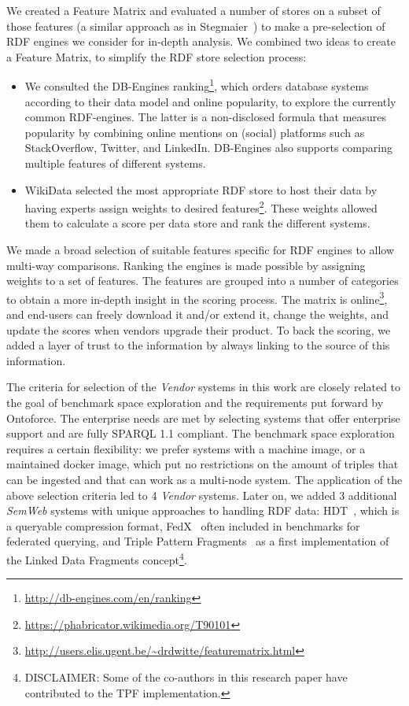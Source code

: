 
We created a Feature Matrix and evaluated a number of stores on a subset of those features (a similar approach as in Stegmaier~\cite{Stegmaier_evaluationof}) to make a pre-selection of RDF engines we consider for in-depth analysis.
We combined two ideas to create a Feature Matrix, to simplify the RDF store selection process:
\begin{itemize}
\item We consulted the DB-Engines ranking\footnote{\scriptsize \url{http://db-engines.com/en/ranking}}, which orders database systems according to their data model and online popularity, to explore the currently common 
RDF-engines.
The latter is a non-disclosed formula that measures popularity by combining online mentions on (social) platforms such as StackOverflow, Twitter, and LinkedIn. 
DB-Engines also supports comparing multiple features of different systems.
\item WikiData selected the most appropriate RDF store to host their data by having experts assign weights to desired features\footnote{\scriptsize \url{https://phabricator.wikimedia.org/T90101}}.
These weights allowed them to calculate a score per data store and rank the different systems. 
\end{itemize}
We made a broad selection of suitable features specific for RDF engines to allow multi-way comparisons. Ranking the engines is made possible by assigning weights to a set of features. 
The features are grouped into a number of categories to obtain a more in-depth insight in the scoring process. 
The matrix is online\footnote{\scriptsize \url{http://users.elis.ugent.be/~drdwitte/featurematrix.html}}, and end-users can freely download it and/or extend it, change the weights, and update the scores when vendors upgrade their product. 
To back the scoring, we added a layer of trust to the information by always linking to the source of this information.

The criteria for selection of the \emph{Vendor} systems in this work are closely related to the goal of benchmark space exploration and the requirements put forward by Ontoforce. 
The enterprise needs are met by selecting systems that offer enterprise support and are fully SPARQL 1.1 compliant. The benchmark space exploration requires a certain flexibility: we prefer systems with a machine image, or a maintained docker image, which put no restrictions on the amount of triples that can be ingested and that can work as a multi-node system.
The application of the above selection criteria led to 4 \emph{Vendor} systems. 
Later on, we added 3 additional \emph{SemWeb} systems with unique approaches to handling RDF data: HDT~\cite{DBLP:journals/ws/FernandezMGPA13}, which is a queryable compression format, FedX~\cite{DBLP:conf/semweb/SchwarteHHSS11} often included in benchmarks for federated querying, and Triple Pattern Fragments~\cite{DBLP:conf/semweb/VerborghHMHVSCCMW14} as a first implementation of the Linked Data Fragments concept\footnote{DISCLAIMER: Some of the co-authors in this research paper have contributed to the TPF implementation.}.

